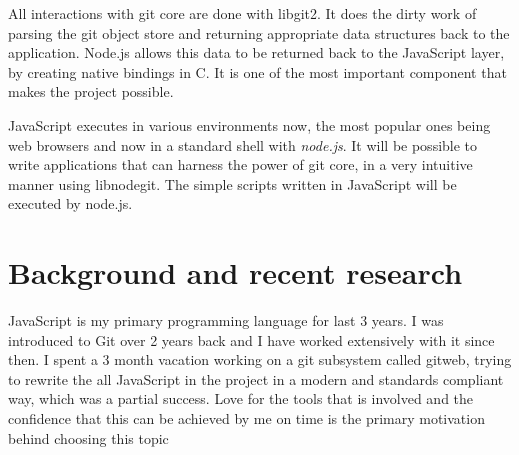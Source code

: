 All interactions with git core are done with libgit2. It does the dirty work of
parsing the git object store and returning appropriate data structures back to
the application. Node.js allows this data to be returned back to the JavaScript
layer, by creating native bindings in C. It is one of the most important
component that makes the project possible.

JavaScript executes in various environments now, the most popular ones being web
browsers and now in a standard shell with \textit{node.js}. It will be possible
to write applications that can harness the power of git core, in a very
intuitive manner using libnodegit. The simple scripts written in JavaScript will
be executed by node.js.

\section{Background and recent research}

JavaScript is my primary programming language for last 3 years. I was introduced
to Git over 2 years back and I have worked extensively with it since then. I
spent a 3 month vacation working on a git subsystem called gitweb, trying to
rewrite the all JavaScript in the project in a modern and standards compliant
way, which was a partial success. Love for the tools that is involved and the
confidence that this can be achieved by me on time is the primary motivation
behind choosing this topic
